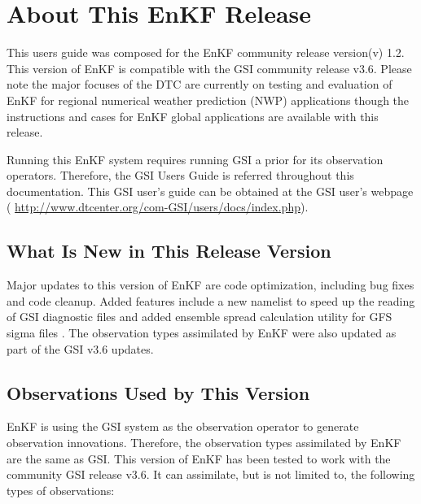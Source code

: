 \section{About This EnKF Release}

This user\textquotesingle s guide was composed for the EnKF community release version(v) 1.2. This version of EnKF is compatible with the GSI community release v3.6. Please note the major focuses of the DTC are currently on testing and evaluation of EnKF for regional numerical weather prediction (NWP) applications though the instructions and cases for EnKF global applications are available with this release. 


Running this EnKF system requires running GSI a prior for its observation operators. Therefore, the GSI 
User\textquotesingle s Guide is referred throughout this documentation. This GSI user's guide can be obtained at the GSI user's webpage ( \url{http://www.dtcenter.org/com-GSI/users/docs/index.php}).

\subsection{What Is New in This Release Version}

Major updates to this version of EnKF are code optimization, including bug fixes and code cleanup. Added features include a new namelist to speed up the reading of GSI diagnostic files  and added ensemble spread calculation utility for GFS sigma files . The observation types assimilated by EnKF were also updated as part of the GSI v3.6 updates.

\subsection{Observations Used by This Version }
EnKF is using the GSI system as the observation operator to generate observation innovations. Therefore, the observation types assimilated by EnKF are the same as GSI. This version of EnKF has been tested to work with the community GSI release v3.6. It can assimilate, but is not limited to, the following types of observations:

